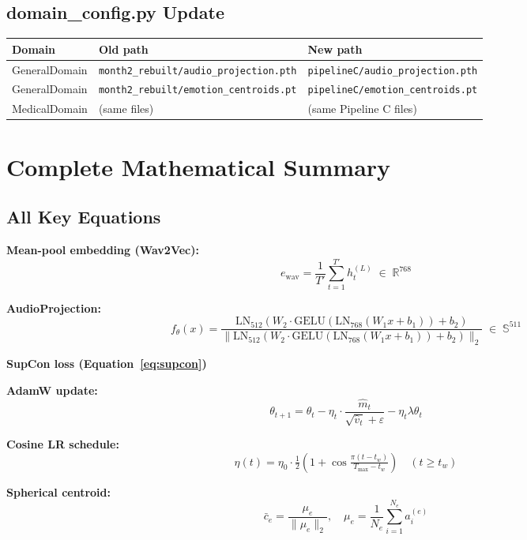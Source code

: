 \documentclass[12pt,a4paper]{article}
\theoremstyle{definition}
\theoremstyle{plain}
\theoremstyle{remark}
\begin{document}
\subsection{domain\_config.py Update}

\begin{center}
\renewcommand{\arraystretch}{1.1}
\begin{tabular}{@{}lll@{}}
\toprule
\textbf{Domain} & \textbf{Old path} & \textbf{New path} \\
\midrule
GeneralDomain & \texttt{month2\_rebuilt/audio\_projection.pth} & \texttt{pipelineC/audio\_projection.pth} \\
GeneralDomain & \texttt{month2\_rebuilt/emotion\_centroids.pt} & \texttt{pipelineC/emotion\_centroids.pt} \\
MedicalDomain & (same files) & (same Pipeline C files) \\
\bottomrule
\end{tabular}
\end{center}

\section{Complete Mathematical Summary}

\subsection{All Key Equations}

\textbf{Mean-pool embedding (Wav2Vec):}
\[
  e_{\text{wav}} = \frac{1}{T'}\sum_{t=1}^{T'} h_t^{(L)} \;\in\; \mathbb{R}^{768}
\]

\textbf{AudioProjection:}
\[
  f_\theta(x) = \frac{\mathrm{LN}_{512}(W_2\cdot\mathrm{GELU}(\mathrm{LN}_{768}(W_1 x+b_1))+b_2)}
  {\|\mathrm{LN}_{512}(W_2\cdot\mathrm{GELU}(\mathrm{LN}_{768}(W_1 x+b_1))+b_2)\|_2}
  \;\in\; \mathbb{S}^{511}
\]

\textbf{SupCon loss (Equation~\ref{eq:supcon})}

\textbf{AdamW update:}
\[
  \theta_{t+1} = \theta_t - \eta_t\cdot\frac{\hat{m}_t}{\sqrt{\hat{v}_t}+\varepsilon}
  - \eta_t\lambda\theta_t
\]

\textbf{Cosine LR schedule:}
\[
  \eta(t) = \eta_0\cdot\tfrac{1}{2}\!\left(1+\cos\tfrac{\pi(t-t_w)}{T_{\max}-t_w}\right)
  \quad (t\geq t_w)
\]

\textbf{Spherical centroid:}
\[
  \bar{c}_e = \frac{\mu_e}{\|\mu_e\|_2}, \quad
  \mu_e = \frac{1}{N_e}\sum_{i=1}^{N_e}\hat{a}_i^{(e)}
\]
\end{document}
